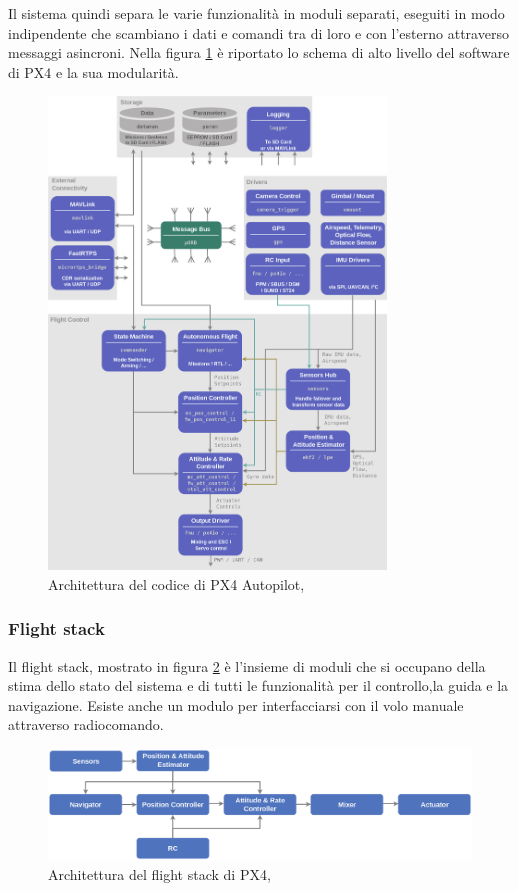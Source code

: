 Il sistema quindi separa le varie funzionalità in moduli separati, eseguiti in modo indipendente che scambiano i dati e comandi tra di loro e con l'esterno attraverso messaggi asincroni.
Nella figura \ref{fig:px4.architettura} è riportato lo schema di alto livello del software di PX4 e la sua modularità.

\begin{figure}
	\centering
	\includegraphics[width=0.8\textwidth]{DescrizioneAutopilota/Figure/PX4_Architecture}
	\caption{Architettura del codice di PX4 Autopilot, \cite{px4Guide}}
	\label{fig:px4.architettura}
\end{figure}
\subsubsection{Flight stack}
Il flight stack, mostrato in figura \ref{fig:px4.flightstack} è l'insieme di moduli che si occupano della stima dello stato del sistema e di tutti le funzionalità per il controllo,la guida e la navigazione. Esiste anche un modulo per interfacciarsi con il volo manuale attraverso radiocomando.
	\begin{figure}[ht]
	\centering
	\includegraphics[width=1\textwidth]{DescrizioneAutopilota/Figure/PX4_High-Level_Flight-Stack}
	\caption{Architettura del flight stack di PX4, \cite{px4Guide}}
	\label{fig:px4.flightstack}
\end{figure}
